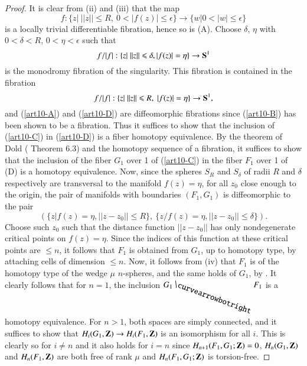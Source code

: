 \begin{proof}
It is clear from (ii) and (iii) that the map
\begin{equation}
f: \{z|~ ||z|| \leqslant R,~ 0 < |f (z)| \leqslant \epsilon\}  \to \{w |0 < |w| \leq \epsilon \} \label{art10-B}
\end{equation}
is a locally trivial differentiable fibration, hence so is (A). Choose $\delta$, $\eta$ with $0< \delta < R$, $0< \eta< \epsilon$ such that 
\begin{equation}
f/ |f|: \{z | ~ ||z|| \leqslant \delta, |f(z)| = \eta\} \to \mathbf{S}^{1} \label{art10-C}
\end{equation}
is the monodromy fibration of the singularity. This fibration is contained in the fibration\pageoriginale 
\begin{equation}
f/ |f|: \{z|~ ||z|| \leqslant R, ~ |f(z)| = \eta \} \to \mathbf{S}^1, \label{art10-D}
\end{equation}
and (\ref{art10-A}) and (\ref{art10-D}) are diffeomorphic fibrations since (\ref{art10-B}) has been shown to be a fibration. Thus it suffices to show that the inclusion of (\ref{art10-C}) in (\ref{art10-D}) is a fiber homotopy equivalence. By the theorem of Dold (\cite{art10-key4} Theorem 6.3) and the homotopy sequence of a fibration, it suffices to show that the inclusion of the fiber $G_1$ over 1 of (\ref{art10-C}) in the fiber $F_1$ over 1 of (D) is a homotopy equivalence. Now, since the spheres $S_R$ and $S_\delta$ of radii $R$ and $\delta$ respectively are transversal to the manifold $f(z) = \eta$, for all $z_0$ close enough to the origin, the pair of manifolds with boundaries $(F_1, G_1)$ is diffeomorphic to the pair
$$
(\{z | f(z) = \eta, ||z - z_0|| \leqslant R\}, ~ \{z / f (z) = \eta, ||z- z_0|| \leqslant \delta \}).
$$
Choose such $z_0$ such that the distance function $||z - z_0||$ has
only nondegenerate critical points on $f(z) = \eta$. Since the indices
of this function at these critical points are $\leqslant n$, it
follows that $F_1$ is obtained from $G_1$, up to homotopy type, by
attaching cells of dimension $\leqslant n$. Now, it follows from (iv)
that $F_1$ is of the homotopy type of the wedge $\mu$ $n$-spheres, and
the same holds of $G_1$, by \cite{art10-key9}. It clearly follows that
for $n=1$, the inclusion $G_1 \raisebox{2pt}{\rotatebox{-20}{$\curvearrowbotright$}}\, F_1$ is a homotopy
equivalence. For $n>1$, both spaces are simply connected, and it
suffices to show that $H_i (G_1, \mathbf{Z}) \to H_i (F_1, \mathbf{Z})$ is an
isomorphism for all $i$. This is clearly so for $i \neq n$ and it also
holds for $i=n$ since $H_{n+1} (F_1, G_1; \mathbf{Z}) =0$, $H_n(G_1, \mathbf{Z})$
and $H_n (F_1, \mathbf{Z})$ are both free of rank $\mu$ and $H_n
(F_1,G_1; \mathbf{Z})$ is torsion-free. 


\end{proof}

